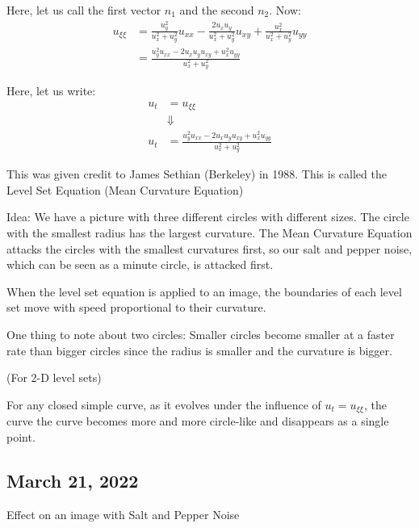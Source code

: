 \documentclass{article}
\begin{document}
Here, let us call the first vector $n_1$ and the second $n_2$. Now:
%
\begin{align}
  u_{\xi \xi} & = \frac{u^2_y}{u^2_x + u^2_y} u_{xx} - \frac{2 u_x u_y}{u^2_x + u^2_y} u_{xy} + \frac{u^2_x}{u^2_x + u^2_y} u_{yy}\\
  & = \frac{u^2_y u_{xx} - 2u_x u_y u_{xy} + u^2_x u_{yy}}{u^2_x + u^2_y}
\end{align}

Here, let us write:
%
\begin{align}
  u_t & = u_{\xi\xi}\\
  & \Downarrow\\
  u_t & = \frac{u^2_y u_{xx} - 2u_x u_y u_{xy} + u^2_x u_{yy}}{u^2_x + u^2_y}
\end{align}

This was given credit to James Sethian (Berkeley) in 1988. This is called the Level Set Equation (Mean Curvature Equation)

Idea: We have a picture with three different circles with different sizes. The circle with the smallest radius has the largest curvature. The Mean Curvature Equation attacks the circles with the smallest curvatures first, so our salt and pepper noise, which can be seen as a minute circle, is attacked first.

When the level set equation is applied to an image, the boundaries of each level set move with speed proportional to their curvature.

One thing to note about two circles: Smaller circles become smaller at a faster rate than bigger circles since the radius is smaller and the curvature is bigger.

 (For 2-D level sets)

For any closed simple curve, as it evolves under the influence of $u_t = u_{\xi \xi}$, the curve the curve becomes more and more circle-like and disappears as a single point.


\subsection*{March 21, 2022}

Effect on an image with Salt and Pepper Noise

\end{document}

